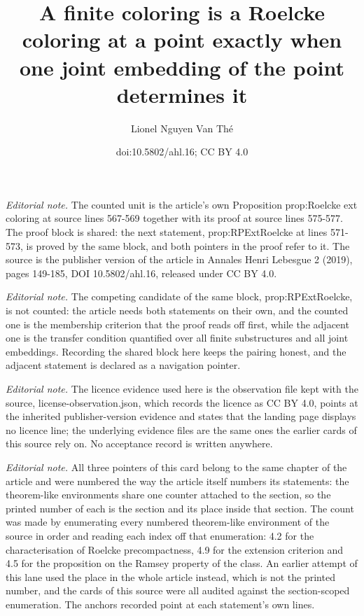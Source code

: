 \documentclass[10pt,a4paper]{article}
\title{A finite coloring is a Roelcke coloring at a point exactly when one joint embedding of the point determines it}
\author{Lionel Nguyen Van Thé}
\date{doi:10.5802/ahl.16; CC BY 4.0}
\theoremstyle{definition}
\numberwithin{equation}{section}
\numberwithin{figure}{section}
\numberwithin{table}{section}
\begin{document}
\maketitle
\noindent\textit{Editorial note.} The counted unit is the article's own Proposition prop:Roelcke ext coloring at source lines 567-569 together with its proof at source lines 575-577. The proof block is shared: the next statement, prop:RPExtRoelcke at lines 571-573, is proved by the same block, and both pointers in the proof refer to it. The source is the publisher version of the article in Annales Henri Lebesgue 2 (2019), pages 149-185, DOI 10.5802/ahl.16, released under CC BY 4.0.\par\medskip
\noindent\textit{Editorial note.} The competing candidate of the same block, prop:RPExtRoelcke, is not counted: the article needs both statements on their own, and the counted one is the membership criterion that the proof reads off first, while the adjacent one is the transfer condition quantified over all finite substructures and all joint embeddings. Recording the shared block here keeps the pairing honest, and the adjacent statement is declared as a navigation pointer.\par\medskip
\noindent\textit{Editorial note.} The licence evidence used here is the observation file kept with the source, license-observation.json, which records the licence as CC BY 4.0, points at the inherited publisher-version evidence and states that the landing page displays no licence line; the underlying evidence files are the same ones the earlier cards of this source rely on. No acceptance record is written anywhere.\par\medskip
\noindent\textit{Editorial note.} All three pointers of this card belong to the same chapter of the article and were numbered the way the article itself numbers its statements: the theorem-like environments share one counter attached to the section, so the printed number of each is the section and its place inside that section. The count was made by enumerating every numbered theorem-like environment of the source in order and reading each index off that enumeration: 4.2 for the characterisation of Roelcke precompactness, 4.9 for the extension criterion and 4.5 for the proposition on the Ramsey property of the class. An earlier attempt of this lane used the place in the whole article instead, which is not the printed number, and the cards of this source were all audited against the section-scoped enumeration. The anchors recorded point at each statement's own lines.\par\medskip
\end{document}
